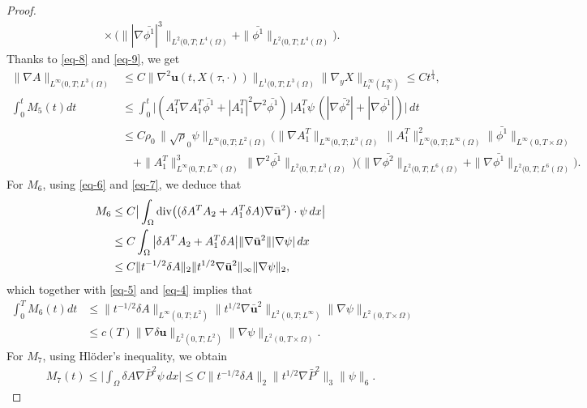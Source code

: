 \documentclass[11pt]{article}
\newcommand{\Dv}{{\rm div}}
\numberwithin{equation}{section}
\begin{document}
\begin{proof}
\begin{align*}
&\quad\times\big( \||\nabla \bar{\phi^1}|^{3}\|_{L^2(0,T; L^4(\Omega)} + \|\bar{\phi^1}\|_{L^2(0,T; L^4(\Omega)} \big).
\end{align*}
Thanks to \eqref{eq-8} and \eqref{eq-9}, we get
\begin{align*}
\| \nabla A \|_{L^\infty (0,T; L^3(\Omega)} &\leq C \| \nabla^2 \mathbf{u}(t, X(\tau, \cdot)) \|_{L^1(0,T; L^3(\Omega)} \| \nabla_y X \|_{L_t^\infty (L_y^\infty)} \leq C t^{\frac{1}{4}},\\
\int_{0}^{t} M_{5}(t) dt &\leq\int_{0}^{t} \bigl\lvert (A_1^T \nabla A_1^T \bar{\phi^1} + |A_1^T|^2 \nabla^2 \bar{\phi^1}) \, |A_1^T \psi \, (|\nabla \bar{\phi^2}| + |\nabla \bar{\phi^1}|) \bigr\rvert \, dt \\
&\leq C \rho_0 \,\|\sqrt\rho_0 \psi\|_{L^\infty(0,T; L^2(\Omega)}\big(\|\nabla A_1^T\|_{L^\infty(0,T; L^3(\Omega)} \,\|A_1^T\|_{L^\infty(0,T; L^\infty(\Omega)}^2
\|\bar{\phi^1}\|_{L^\infty(0,T\times\Omega)}\\
&\quad+\|A_1^T\|_{L^\infty(0,T; L^\infty(\Omega)}^3\,
\|\nabla^2 \bar{\phi^1}\|_{L^2(0,T; L^3(\Omega)} \,\big)\big( \|\nabla \bar{\phi^2}\|_{L^2(0,T; L^{6}(\Omega)} + \|\nabla \bar{\phi^1}\|_{L^2(0,T; L^{6}(\Omega)} \big).
\end{align*}
For \( M_6 \), using \eqref{eq-6} and \eqref{eq-7}, we deduce that
\begin{align*}
M_6 &\leq C \big| \int_{\Omega}\Dv\big((\delta A^T A_2 + A_1^T \delta A)\nabla \bar{\mathbf{u}}^2\big) \cdot \psi \, dx \big| \\
&\leq C \int_{\Omega} \big| \delta A^T A_2 + A_1^T \delta A \big| \| \nabla \bar{\mathbf{u}}^2 \| |\nabla \psi| \, dx \\
&\leq C \| t^{-1/2} \delta A \|_2 \| t^{1/2} \nabla \bar{\mathbf{u}}^2 \|_\infty \| \nabla \psi \|_2,
\end{align*}
which together with \eqref{eq-5} and \eqref{eq-4} implies that
\begin{align*}
\int_0^T M_6(t) dt &\leq \| t^{-1/2} \delta A \|_{L^\infty(0,T; L^2)} \| t^{1/2} \nabla \bar{\mathbf{u}}^2 \|_{L^2(0,T; L^\infty)} \| \nabla \psi \|_{L^2(0,T \times \Omega)} \\
&\leq c(T) \| \nabla \delta \mathbf{u} \|_{L^2(0,T; L^2)} \| \nabla \psi \|_{L^2(0,T \times \Omega)}.
\end{align*}
For \( M_7 \), using Hl\"{o}der's inequality, we obtain
\begin{align*}
M_7(t) \leq \big| \int_{\Omega} \delta A \nabla \bar{P}^2 \psi \, dx \big| \leq C \| t^{-1/2} \delta A \|_2 \| t^{1/2} \nabla \bar{P}^2 \|_3 \| \psi \|_6.

\end{align*}
\end{proof}
\end{document}
